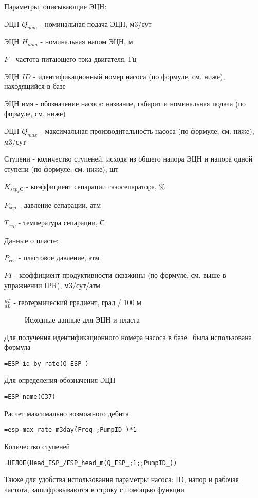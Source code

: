 Параметры, описывающие ЭЦН: 

ЭЦН $Q_{nom}$ - номинальная подача ЭЦН, м3/сут

ЭЦН $H_{nom}$ - номинальная напом ЭЦН, м

$F$ - частота питающего тока двигателя, Гц

ЭЦН $ID$ - идентификационный номер насоса (по формуле, см. ниже), находящийся в базе \unf

ЭЦН имя - обозначение насоса: название, габарит и номинальная подача (по формуле, см. ниже)

ЭЦН $Q_{max}$ - максимальная производительность насоса (по формуле, см. ниже), м3/сут

Ступени - количество ступеней, исходя из общего напора ЭЦН и напора одной ступени (по формуле, см. ниже), шт

$K_{sep_ГС}$ - коэффициент сепарации газосепаратора, \%

$P_{sep}$ - давление сепарации, атм

$T_{sep}$ - температура сепарации, С

Данные о пласте:

$P_{res}$ - пластовое давление, атм

$PI$ - коэффициент продуктивности скважины (по формуле, см. выше в упражнении IPR), м3/сут/атм

$\frac{dT}{dL}$ - геотермический градиент, град / 100 м

\begin{figure}[h!]
	\center{\texttt{[image: Ex70\_2]}}
	\caption{Исходные данные для ЭЦН и пласта}
	\label{ris:Ex70_2}
\end{figure}

Для получения идентификационного номера насоса в базе \unf \ была использована формула

{ \small  \texttt{=ESP\_id\_by\_rate(Q\_ESP\_)}}

Для определения обозначения ЭЦН

{ \small  \texttt{=ESP\_name(C37)}}

Расчет максимально возможного дебита

{ \small  \texttt{=esp\_max\_rate\_m3day(Freq\_;PumpID\_)*1}}

Количество ступеней

{ \small  \texttt{=ЦЕЛОЕ(Head\_ESP\_/ESP\_head\_m(Q\_ESP\_;1;;PumpID\_))
}}

Также для удобства использования параметры насоса: ID, напор и рабочая частота, зашифровываются в строку с помощью функции

